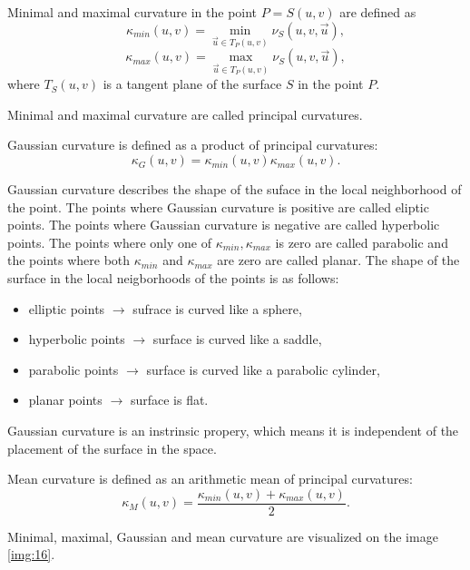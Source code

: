 \begin{definition}
    Minimal and maximal curvature in the point $P = S(u,v)$ are defined as
    $$\kappa_{min}(u,v) = \min_{\overrightarrow{u} \in T_P(u, v)} \nu_S(u, v, \overrightarrow{u}),$$
    $$\kappa_{max}(u,v) = \max_{\overrightarrow{u} \in T_P(u, v)} \nu_S(u, v, \overrightarrow{u}),$$
    where $T_S(u, v)$ is a tangent plane of the surface $S$ in the point $P$.

    Minimal and maximal curvature are called principal curvatures. 
\end{definition}

\begin{definition}
    Gaussian curvature is defined as a product of principal curvatures:
    $$\kappa_G(u, v) = \kappa_{min}(u,v) \kappa_{max}(u,v).$$
\end{definition}

Gaussian curvature describes the shape of the suface in the local neighborhood of the point.
The points where Gaussian curvature is positive are called eliptic points.
The points where Gaussian curvature is negative are called hyperbolic points.
The points where only one of $\kappa_{min}, \kappa_{max}$ is zero are called parabolic and
the points where both $\kappa_{min}$ and $\kappa_{max}$ are zero are called planar.
The shape of the surface in the local neigborhoods of the points is as follows:
\begin{itemize}
    \item {elliptic points $\longrightarrow$ sufrace is curved like a sphere,}
    \item {hyperbolic points $\longrightarrow$ surface is curved like a saddle,}
    \item {parabolic points $\longrightarrow$ surface is curved like a parabolic cylinder,}
    \item {planar points $\longrightarrow$ surface is flat.}

\end{itemize}
Gaussian curvature is an
instrinsic propery, which means it is independent of the placement of the surface in the space.

\begin{definition}
    Mean curvature is defined as an arithmetic mean of principal curvatures:
    $$\kappa_M(u, v) = \frac{\kappa_{min}(u,v) + \kappa_{max}(u,v)}{2}.$$
\end{definition}

Minimal, maximal, Gaussian and mean curvature are visualized on the image \ref{img:16}.

